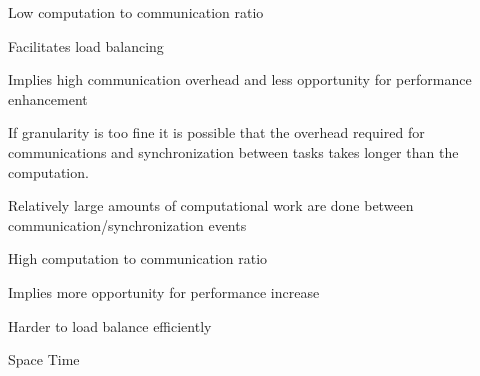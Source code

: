           Low computation to communication ratio

          Facilitates load balancing

          Implies high communication overhead and less opportunity for performance enhancement

          If granularity is too fine it is possible that the overhead required for communications and synchronization between tasks takes longer than the computation.


          Relatively large amounts of computational work are done between communication/synchronization events

          High computation to communication ratio

          Implies more opportunity for performance increase

          Harder to load balance efficiently

  Space
  Time
